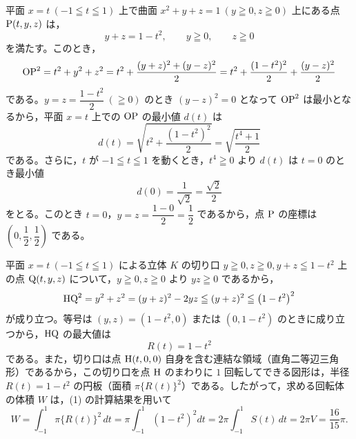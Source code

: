 
平面 $x=t\ (-1\leqq t\leqq 1)$ 上で曲面 $x^{2}+y+z=1\ (y\geqq 0, z\geqq 0)$ 上にある点 $\mathrm{P}(t, y, z)$ は，
\[
  y + z = 1 - t^{2},\qquad y \geqq 0,\qquad z \geqq 0
\]
を満たす。このとき，
\[
  \mathrm{OP}^{2} = t^{2} + y^{2} + z^{2}
  = t^{2} + \frac{(y+z)^{2}+(y-z)^{2}}{2}
  = t^{2} + \frac{(1-t^{2})^{2}}{2} + \frac{(y-z)^{2}}{2}
\]
である。$y=z=\dfrac{1-t^{2}}{2}\ (\geqq 0)$ のとき $(y-z)^{2}=0$ となって $\mathrm{OP}^{2}$ は最小となるから，平面 $x=t$ 上での $\mathrm{OP}$ の最小値 $d(t)$ は
\[
  d(t) = \sqrt{t^{2}+\frac{(1-t^{2})^{2}}{2}} = \sqrt{\frac{t^{4}+1}{2}}
\]
である。さらに，$t$ が $-1\leqq t\leqq 1$ を動くとき，$t^{4}\geqq 0$ より $d(t)$ は $t=0$ のとき最小値
\[
  d(0) = \frac{1}{\sqrt{2}} = \frac{\sqrt{2}}{2}
\]
をとる。このとき $t=0$，$y=z=\dfrac{1-0}{2}=\dfrac{1}{2}$ であるから，点 $\mathrm{P}$ の座標は $\left(0, \dfrac{1}{2}, \dfrac{1}{2}\right)$ である。


平面 $x=t\ (-1\leqq t\leqq 1)$ による立体 $K$ の切り口 $y\geqq 0, z\geqq 0, y+z\leqq 1-t^{2}$ 上の点 $\mathrm{Q}(t, y, z)$ について，$y\geqq 0, z\geqq 0$ より $yz\geqq 0$ であるから，
\[
  \mathrm{HQ}^{2} = y^{2} + z^{2} = (y+z)^{2} - 2yz \leqq (y+z)^{2} \leqq \left(1-t^{2}\right)^{2}
\]
が成り立つ。等号は $(y, z)=(1-t^{2}, 0)$ または $(0, 1-t^{2})$ のときに成り立つから，$\mathrm{HQ}$ の最大値は
\[
  R(t) = 1 - t^{2}
\]
である。また，切り口は点 $\mathrm{H}(t, 0, 0)$ 自身を含む連結な領域（直角二等辺三角形）であるから，この切り口を点 $\mathrm{H}$ のまわりに $1$ 回転してできる図形は，半径 $R(t)=1-t^{2}$ の円板（面積 $\pi\{R(t)\}^{2}$）である。したがって，求める回転体の体積 $W$ は，(1) の計算結果を用いて
\[
  W = \int_{-1}^{1}\pi\{R(t)\}^{2}\,dt
  = \pi\int_{-1}^{1}\left(1-t^{2}\right)^{2}dt
  = 2\pi\int_{-1}^{1}S(t)\,dt = 2\pi V = \frac{16}{15}\pi.
\]



